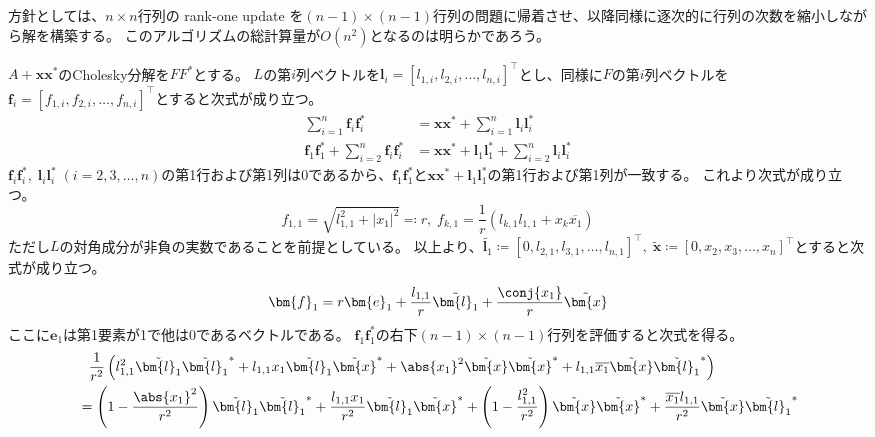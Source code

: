         \begin{derivation*}
            方針としては、$n\times n$行列の rank-one update を$(n-1)\times(n-1)$行列の問題に帰着させ、以降同様に逐次的に行列の次数を縮小しながら解を構築する。
            このアルゴリズムの総計算量が$O(n^2)$となるのは明らかであろう。
            \par
            $A+\bm{x}\bm{x}^*$のCholesky分解を$FF^*$とする。
            $L$の第$i$列ベクトルを$\bm{l}_i = [l_{1,i},l_{2,i},\dots,l_{n,i}]^\top$とし、同様に$F$の第$i$列ベクトルを$\bm{f}_i = [f_{1,i},f_{2,i},\dots,f_{n,i}]^\top$とすると次式が成り立つ。
            \begin{align*}
                \sum_{i=1}^n \bm{f}_i\bm{f}_i^* &= \bm{x}\bm{x}^* + \sum_{i=1}^n \bm{l}_i\bm{l}_i^* \\
                \bm{f}_1\bm{f}_1^* + \sum_{i=2}^n \bm{f}_i\bm{f}_i^* &= \bm{x}\bm{x}^* + \bm{l}_1\bm{l}_1^* + \sum_{i=2}^n \bm{l}_i\bm{l}_i^* \tag{1}
            \end{align*}
            $\bm{f}_i\bm{f}_i^*,\;\bm{l}_i\bm{l}_i^*\;(i=2,3,\dots,n)$の第1行および第1列は0であるから、$\bm{f}_1\bm{f}_1^*$と$\bm{x}\bm{x}^* + \bm{l}_1\bm{l}_1^*$の第1行および第1列が一致する。
            これより次式が成り立つ。
            \[ f_{1,1} = \sqrt{l_{1,1}^2 + |x_1|^2} \eqqcolon r,\; f_{k,1} = \frac{1}{r}\left(l_{k,1}l_{1,1} + x_k\overline{x_1}\right) \tag{2} \]
            ただし$L$の対角成分が非負の実数であることを前提としている。
            以上より、$\tilde{\bm{l}_1} \coloneqq [0,l_{2,1},l_{3,1},\dots,l_{n,1}]^\top,\;\tilde{\bm{x}} \coloneqq [0,x_2,x_3,\dots,x_n]^\top$とすると次式が成り立つ。
            \[ \bm{f}_1 = r\bm{e}_1 + \frac{l_{1,1}}{r}\tilde{\bm{l}_1} + \frac{\conj{x_1}}{r}\tilde{\bm{x}} \]
            ここに$\bm{e}_1$は第1要素が1で他は0であるベクトルである。
            $\bm{f}_1\bm{f}_1^*$の右下$(n-1)\times(n-1)$行列を評価すると次式を得る。
            \begin{align*}
                &\phantom{=} \frac{1}{r^2} \left(l_{1,1}^2\tilde{\bm{l}_1}\tilde{\bm{l}_1}^* + l_{1,1}x_1\tilde{\bm{l}_1}\tilde{\bm{x}}^* + \abs{x_1}^2\tilde{\bm{x}}\tilde{\bm{x}}^* + l_{1,1}\overline{x_1}\tilde{\bm{x}}\tilde{\bm{l}_1}^*\right) \\
                &= \left(1 - \frac{\abs{x_1}^2}{r^2}\right)\tilde{\bm{l}_1}\tilde{\bm{l}_1}^* + \frac{l_{1,1}x_1}{r^2}\tilde{\bm{l}_1}\tilde{\bm{x}}^* + \left(1 - \frac{l_{1,1}^2}{r^2}\right)\tilde{\bm{x}}\tilde{\bm{x}}^* + \frac{\overline{x_1}l_{1,1}}{r^2}\tilde{\bm{x}}\tilde{\bm{l}_1}^* \\

\end{align*}
\end{derivation*}
